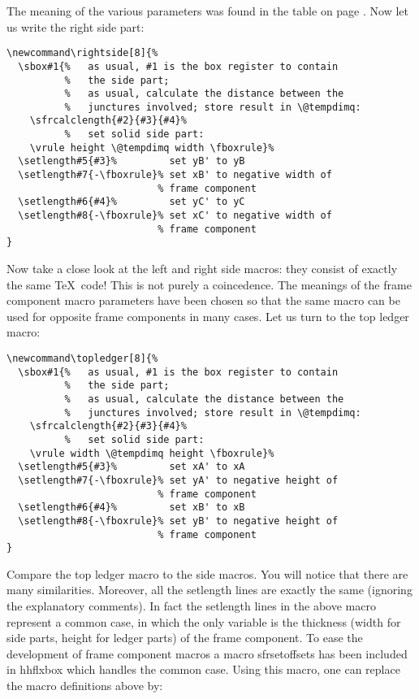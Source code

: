 \documentclass[11pt]{article}
\makeatletter
\def\packagename#1{{\sffamily #1}}     %
\def\macroname#1{{\ttfamily\@ttbs#1}}  %
\def\hhflxbox{\packagename{hhflxbox}\xspace}
\def\<#1>{\macroname{#1}}
\makeatother
\begin{document}
The meaning of the various parameters was found in the table
on page \pageref{sframetable}. Now let us write the right side
part:

\begin{verbatim}
\newcommand\rightside[8]{%
  \sbox#1{%   as usual, #1 is the box register to contain
          %   the side part;
          %   as usual, calculate the distance between the
          %   junctures involved; store result in \@tempdimq:
    \sfrcalclength{#2}{#3}{#4}%
          %   set solid side part:
    \vrule height \@tempdimq width \fboxrule}%
  \setlength#5{#3}%         set yB' to yB
  \setlength#7{-\fboxrule}% set xB' to negative width of
                          % frame component
  \setlength#6{#4}%         set yC' to yC
  \setlength#8{-\fboxrule}% set xC' to negative width of
                          % frame component
}
\end{verbatim}

Now take a close look at the left and right side macros: they
consist of exactly the same \TeX\ code! This is not purely a coincedence.
The meanings of the frame component macro parameters have been
chosen so that the same macro can be used for opposite frame
components in many cases. Let us turn to the top ledger macro:

\begin{verbatim}
\newcommand\topledger[8]{%
  \sbox#1{%   as usual, #1 is the box register to contain
          %   the side part;
          %   as usual, calculate the distance between the
          %   junctures involved; store result in \@tempdimq:
    \sfrcalclength{#2}{#3}{#4}%
          %   set solid side part:
    \vrule width \@tempdimq height \fboxrule}%
  \setlength#5{#3}%         set xA' to xA
  \setlength#7{-\fboxrule}% set yA' to negative height of
                          % frame component
  \setlength#6{#4}%         set xB' to xB
  \setlength#8{-\fboxrule}% set yB' to negative height of
                          % frame component
}
\end{verbatim}

Compare the top ledger macro to the side macros. You will notice that
there are many similarities. Moreover, all the \<setlength> lines
are exactly the same (ignoring the explanatory comments). In fact
the \<setlength> lines in the above macro represent a common case,
in which the only variable is the thickness (width for side parts,
height for ledger parts) of the frame component. To ease the development
of frame component macros a macro \<sfrsetoffsets> has been included
in \hhflxbox which handles the common case. Using this macro, one can
replace the macro definitions above by:
\end{document}

